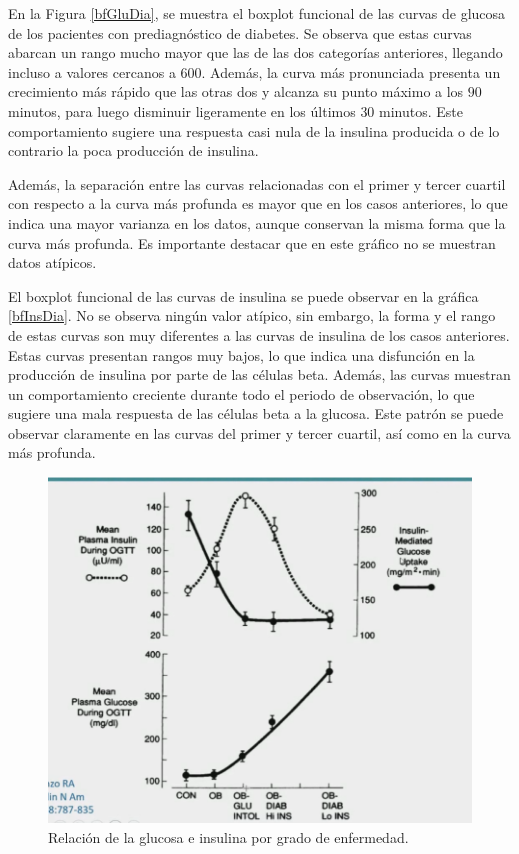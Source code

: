 En la Figura \ref{bfGluDia}, se muestra el boxplot funcional de las curvas de glucosa de los pacientes con prediagnóstico de diabetes. Se observa que estas curvas abarcan un rango mucho mayor que las de las dos categorías anteriores, llegando incluso a valores cercanos a $600$. Además, la curva más pronunciada presenta un crecimiento más rápido que las otras dos y alcanza su punto máximo a los $90$ minutos, para luego disminuir ligeramente en los últimos $30$ minutos. Este comportamiento sugiere una respuesta casi nula de la insulina producida o de lo contrario la poca producción de insulina. 

Además, la separación entre las curvas relacionadas con el primer y tercer cuartil con respecto a la curva más profunda es mayor que en los casos anteriores, lo que indica una mayor varianza en los datos, aunque conservan la misma forma que la curva más profunda. Es importante destacar que en este gráfico no se muestran datos atípicos.

El boxplot funcional de las curvas de insulina se puede observar en la gráfica \ref{bfInsDia}. No se observa ningún valor atípico, sin embargo, la forma y el rango de estas curvas son muy diferentes a las curvas de insulina de los casos anteriores. Estas curvas presentan rangos muy bajos, lo que indica una disfunción en la producción de insulina por parte de las células beta. Además, las curvas muestran un comportamiento creciente durante todo el periodo de observación, lo que sugiere una mala respuesta de las células beta a la glucosa.  Este patrón se puede observar claramente en las curvas del primer y tercer cuartil, así como en la curva más profunda.

\begin{figure}[H]
    \centering
    \includegraphics[width = 0.8 \textwidth]{Imagenes/InsulinaGlucosa.png}
    \caption{Relación de la glucosa e insulina por grado de enfermedad.}
    \label{fig:relGluIns}
\end{figure}

